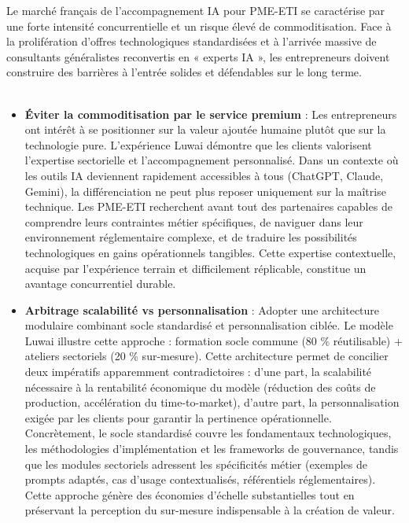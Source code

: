 Le marché français de l'accompagnement IA pour PME-ETI se caractérise par une forte intensité concurrentielle et un risque élevé de commoditisation. Face à la prolifération d'offres technologiques standardisées et à l'arrivée massive de consultants généralistes reconvertis en « experts IA », les entrepreneurs doivent construire des barrières à l'entrée solides et défendables sur le long terme.
\\\\
\begin{itemize}
    \item \textbf{Éviter la commoditisation par le service premium} : Les entrepreneurs ont intérêt à se positionner sur la valeur ajoutée humaine plutôt que sur la technologie pure. L'expérience Luwai démontre que les clients valorisent l'expertise sectorielle et l'accompagnement personnalisé. Dans un contexte où les outils IA deviennent rapidement accessibles à tous (ChatGPT, Claude, Gemini), la différenciation ne peut plus reposer uniquement sur la maîtrise technique. Les PME-ETI recherchent avant tout des partenaires capables de comprendre leurs contraintes métier spécifiques, de naviguer dans leur environnement réglementaire complexe, et de traduire les possibilités technologiques en gains opérationnels tangibles. Cette expertise contextuelle, acquise par l'expérience terrain et difficilement réplicable, constitue un avantage concurrentiel durable.
    
    \item \textbf{Arbitrage scalabilité vs personnalisation} : Adopter une architecture modulaire combinant socle standardisé et personnalisation ciblée. Le modèle Luwai illustre cette approche : formation socle commune (80 \% réutilisable) + ateliers sectoriels (20 \% sur-mesure). Cette architecture permet de concilier deux impératifs apparemment contradictoires : d'une part, la scalabilité nécessaire à la rentabilité économique du modèle (réduction des coûts de production, accélération du time-to-market), d'autre part, la personnalisation exigée par les clients pour garantir la pertinence opérationnelle. Concrètement, le socle standardisé couvre les fondamentaux technologiques, les méthodologies d'implémentation et les frameworks de gouvernance, tandis que les modules sectoriels adressent les spécificités métier (exemples de prompts adaptés, cas d'usage contextualisés, référentiels réglementaires). Cette approche génère des économies d'échelle substantielles tout en préservant la perception du sur-mesure indispensable à la création de valeur.
\end{itemize}

